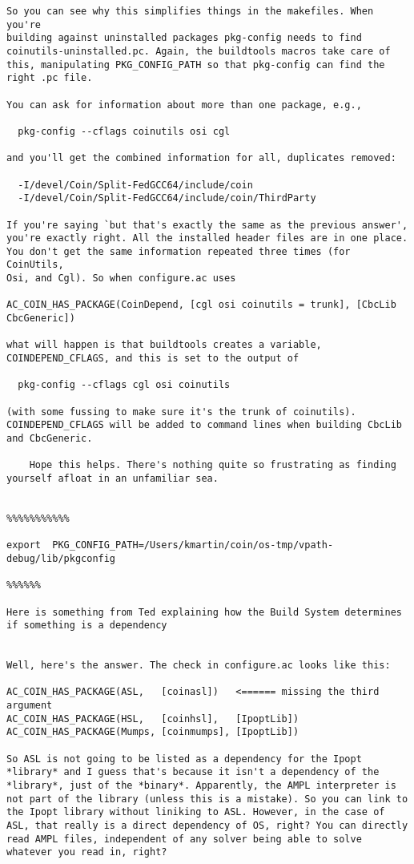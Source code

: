 \begin{verbatim}
So you can see why this simplifies things in the makefiles. When you're
building against uninstalled packages pkg-config needs to find
coinutils-uninstalled.pc. Again, the buildtools macros take care of
this, manipulating PKG_CONFIG_PATH so that pkg-config can find the
right .pc file.

You can ask for information about more than one package, e.g.,

  pkg-config --cflags coinutils osi cgl

and you'll get the combined information for all, duplicates removed:

  -I/devel/Coin/Split-FedGCC64/include/coin 
  -I/devel/Coin/Split-FedGCC64/include/coin/ThirdParty
  
If you're saying `but that's exactly the same as the previous answer',
you're exactly right. All the installed header files are in one place.
You don't get the same information repeated three times (for CoinUtils,
Osi, and Cgl). So when configure.ac uses

AC_COIN_HAS_PACKAGE(CoinDepend, [cgl osi coinutils = trunk], [CbcLib
CbcGeneric])

what will happen is that buildtools creates a variable,
COINDEPEND_CFLAGS, and this is set to the output of

  pkg-config --cflags cgl osi coinutils

(with some fussing to make sure it's the trunk of coinutils).
COINDEPEND_CFLAGS will be added to command lines when building CbcLib
and CbcGeneric.

	Hope this helps. There's nothing quite so frustrating as finding
yourself afloat in an unfamiliar sea.


%%%%%%%%%%%

export  PKG_CONFIG_PATH=/Users/kmartin/coin/os-tmp/vpath-debug/lib/pkgconfig 

%%%%%%

Here is something from Ted explaining how the Build System determines if something is a dependency


Well, here's the answer. The check in configure.ac looks like this:

AC_COIN_HAS_PACKAGE(ASL,   [coinasl])   <====== missing the third argument
AC_COIN_HAS_PACKAGE(HSL,   [coinhsl],   [IpoptLib])
AC_COIN_HAS_PACKAGE(Mumps, [coinmumps], [IpoptLib])

So ASL is not going to be listed as a dependency for the Ipopt
*library* and I guess that's because it isn't a dependency of the
*library*, just of the *binary*. Apparently, the AMPL interpreter is
not part of the library (unless this is a mistake). So you can link to
the Ipopt library without liniking to ASL. However, in the case of
ASL, that really is a direct dependency of OS, right? You can directly
read AMPL files, independent of any solver being able to solve
whatever you read in, right?



\end{verbatim}
